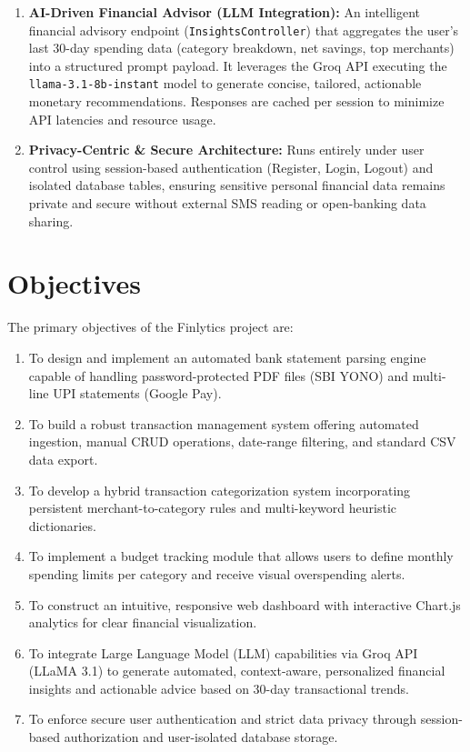 \documentclass[../Project-Report-Main.tex]{subfiles}
\begin{document}
\begin{enumerate}
 \item \textbf{AI-Driven Financial Advisor (LLM Integration):} An intelligent financial advisory endpoint (\texttt{InsightsController}) that aggregates the user's last 30-day spending data (category breakdown, net savings, top merchants) into a structured prompt payload. It leverages the Groq API executing the \texttt{llama-3.1-8b-instant} model to generate concise, tailored, actionable monetary recommendations. Responses are cached per session to minimize API latencies and resource usage.

 \item \textbf{Privacy-Centric \& Secure Architecture:} Runs entirely under user control using session-based authentication (Register, Login, Logout) and isolated database tables, ensuring sensitive personal financial data remains private and secure without external SMS reading or open-banking data sharing.
\end{enumerate}

\section{Objectives}

The primary objectives of the Finlytics project are:

\begin{enumerate}
 \item To design and implement an automated bank statement parsing engine capable of handling password-protected PDF files (SBI YONO) and multi-line UPI statements (Google Pay).
 \item To build a robust transaction management system offering automated ingestion, manual CRUD operations, date-range filtering, and standard CSV data export.
 \item To develop a hybrid transaction categorization system incorporating persistent merchant-to-category rules and multi-keyword heuristic dictionaries.
 \item To implement a budget tracking module that allows users to define monthly spending limits per category and receive visual overspending alerts.
 \item To construct an intuitive, responsive web dashboard with interactive Chart.js analytics for clear financial visualization.
 \item To integrate Large Language Model (LLM) capabilities via Groq API (LLaMA 3.1) to generate automated, context-aware, personalized financial insights and actionable advice based on 30-day transactional trends.
 \item To enforce secure user authentication and strict data privacy through session-based authorization and user-isolated database storage.
\end{enumerate}
\end{document}
